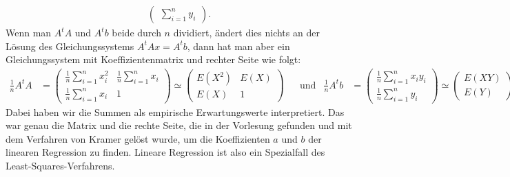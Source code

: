 \begin{loesung}
\[\begin{aligned}
\begin{pmatrix}
\displaystyle \sum_{i=1}^n y_i
\end{pmatrix}.
\end{aligned}
\]
Wenn man $A^tA$ und $A^tb$ beide durch $n$ dividiert, ändert dies nichts an
der Lösung des Gleichungssystems $A^tAx=A^tb$, dann hat man aber ein
Gleichungssystem mit Koeffizientenmatrix und rechter Seite wie folgt:
\begin{align*}
\frac1nA^tA&=\begin{pmatrix}
\displaystyle \frac1n\sum_{i=1}^nx_i^2& \displaystyle \frac1n\sum_{i=1}^nx_i\\
\displaystyle \frac1n\sum_{i=1}^nx_i  & 1
\end{pmatrix}
\simeq
\begin{pmatrix}
E(X^2)&E(X)\\E(X)&1
\end{pmatrix}
&&\text{und}
&
\frac1nA^tb&=\begin{pmatrix}
\displaystyle \frac1n\sum_{i=1}^n x_iy_i\\
\displaystyle \frac1n\sum_{i=1}^n y_i
\end{pmatrix}
\simeq
\begin{pmatrix}
E(XY)\\E(Y)
\end{pmatrix}
\end{align*}
Dabei haben wir die Summen als empirische Erwartungswerte interpretiert.
Das war genau die Matrix und die rechte Seite, die in der Vorlesung gefunden
und mit dem Verfahren von Kramer gelöst wurde, um die Koeffizienten $a$ und $b$
der linearen Regression zu finden.
Lineare Regression ist also ein Spezialfall des Least-Squares-Verfahrens.
\end{loesung}
